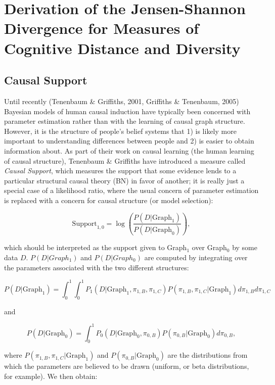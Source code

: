 \documentclass[11pt]{article}
\begin{document}
\section{Derivation of the Jensen-Shannon Divergence for Measures of Cognitive Distance and Diversity}
\label{sec-3}
\subsection{Causal Support}
\label{sec-3-1}

Until recently (Tenenbaum \& Griffiths, 2001, Griffiths \& Tenenbaum, 2005) Bayesian models of human causal induction have typically been concerned with parameter estimation rather than with the learning of causal graph structure. However, it is the structure of people's belief systems that 1) is likely more important to understanding differences between people and 2) is easier to obtain information about. As part of their work on causal learning (the human learning of causal structure), Tenenbaum \& Griffiths have introduced a measure called \emph{Causal Support}, which measures the support that some evidence lends to a particular structural causal theory (BN) in favor of another; it is really just a special case of a likelihood ratio, where the usual concern of parameter estimation is replaced with a concern for causal structure (or model selection):

\begin{equation} \label{eq:support}
\text{Support}_{1,0} = \log\left(\frac{P(D | \text{Graph}_1)}{P(D | \text{Graph}_0)}\right),
\end{equation}

which should be interpreted as the support given to Graph$_1$ over Graph$_0$ by some data $D$. $P(D | Graph_1)$ and $P(D | Graph_0)$ are computed by integrating over the parameters associated with the two different structures:

$$P(D | \text{Graph}_1)=\int_0^1 \int_0^1 P_1(D | \text{Graph}_1, \pi_{1, B}, \pi_{1, C})P(\pi_{1, B}, \pi_{1, C} | \text{Graph}_1) d\pi_{1, B} d\pi_{1, C}$$

and

$$P(D | \text{Graph}_0)=\int_0^1 P_0(D | \text{Graph}_0, \pi_{0,B}) P(\pi_{0, B} | \text{Graph}_0) d\pi_{0, B},$$

where $P(\pi_{1, B}, \pi_{1, C} | \text{Graph}_1)$ and $P(\pi_{0, B} | \text{Graph}_0)$ are the distributions from which the parameters are believed to be drawn (uniform, or beta distributions, for example). We then obtain:
\end{document}
